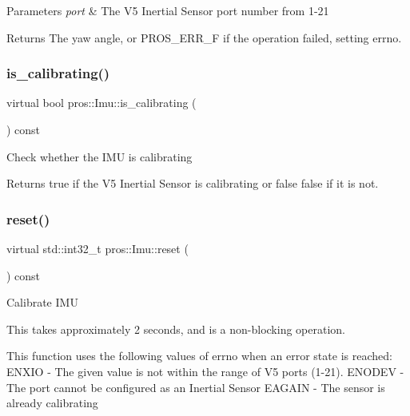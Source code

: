 \begin{DoxyParams}{Parameters}
{\em port} & The V5 Inertial Sensor port number from 1-\/21 \\
\hline
\end{DoxyParams}
\begin{DoxyReturn}{Returns}
The yaw angle, or P\+R\+O\+S\+\_\+\+E\+R\+R\+\_\+F if the operation failed, setting errno. 
\end{DoxyReturn}
\mbox{\label{classpros_1_1Imu_af7426c086f6f810cca98f4e77765189c}} 
\subsubsection{\texorpdfstring{is\+\_\+calibrating()}{is\_calibrating()}}
{\footnotesize\ttfamily virtual bool pros\+::\+Imu\+::is\+\_\+calibrating (\begin{DoxyParamCaption}{ }\end{DoxyParamCaption}) const\hspace{0.3cm}{\ttfamily [virtual]}}

Check whether the I\+MU is calibrating

\begin{DoxyReturn}{Returns}
true if the V5 Inertial Sensor is calibrating or false false if it is not. 
\end{DoxyReturn}
\mbox{\label{classpros_1_1Imu_ad7973cfad5f8f83e7007342055197c43}} 
\subsubsection{\texorpdfstring{reset()}{reset()}}
{\footnotesize\ttfamily virtual std\+::int32\+\_\+t pros\+::\+Imu\+::reset (\begin{DoxyParamCaption}{ }\end{DoxyParamCaption}) const\hspace{0.3cm}{\ttfamily [virtual]}}

Calibrate I\+MU

This takes approximately 2 seconds, and is a non-\/blocking operation.

This function uses the following values of errno when an error state is reached\+: E\+N\+X\+IO -\/ The given value is not within the range of V5 ports (1-\/21). E\+N\+O\+D\+EV -\/ The port cannot be configured as an Inertial Sensor E\+A\+G\+A\+IN -\/ The sensor is already calibrating

